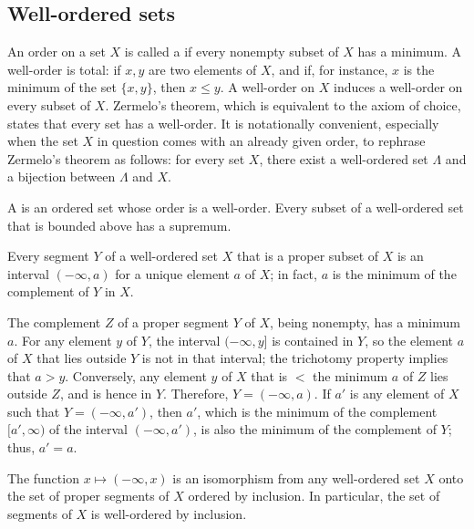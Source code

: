 \documentclass{article}
\begin{document}
\subsection{Well-ordered sets}
\label{sec:62tryw49}

An order on a set \(X\) is called a  if every
nonempty subset of \(X\) has a minimum.  A well-order is total: if
\(x,y\) are two elements of \(X\), and if, for instance, \(x\) is the
minimum of the set \(\{ x, y \}\), then \(x \leq y\).  A well-order on
\(X\) induces a well-order on every subset of \(X\).  Zermelo's
theorem, which is equivalent to the axiom of choice, states that every
set has a well-order.  It is notationally convenient, especially when
the set \(X\) in question comes with an already given order, to
rephrase Zermelo's theorem as follows: for every set \(X\), there
exist a well-ordered set \(\Lambda\) and a bijection between
\(\Lambda\) and \(X\).

A  is an ordered set whose order is a
well-order.  Every subset of a well-ordered set that is bounded above
has a supremum.

\begin{theorem}
  \label{thm:htdzbbwv}
  Every segment \(Y\) of a well-ordered set \(X\) that is a proper
  subset of \(X\) is an interval \((-\infty, a)\) for a unique element
  \(a\) of \(X\); in fact, \(a\) is the minimum of the complement of
  \(Y\) in \(X\).
\end{theorem}

The complement \(Z\) of a proper segment \(Y\) of \(X\), being
nonempty, has a minimum \(a\).  For any element \(y\) of \(Y\), the
interval \((-\infty,y]\) is contained in \(Y\), so the element \(a\)
of \(X\) that lies outside \(Y\) is not in that interval; the
trichotomy property implies that \(a > y\).  Conversely, any element
\(y\) of \(X\) that is \(<\) the minimum \(a\) of \(Z\) lies outside
\(Z\), and is hence in \(Y\).  Therefore, \(Y = (-\infty,a)\).  If
\(a'\) is any element of \(X\) such that \(Y = (-\infty, a')\), then
\(a'\), which is the minimum of the complement \([a', \infty)\) of the
interval \((-\infty, a')\), is also the minimum of the complement of
\(Y\); thus, \(a' = a\).

\begin{theorem}
  \label{thm:b4yv5x3a}
  The function \(x \mapsto (-\infty, x)\) is an isomorphism from any
  well-ordered set \(X\) onto the set of proper segments of \(X\)
  ordered by inclusion.  In particular, the set of segments of \(X\)
  is well-ordered by inclusion.
\end{theorem}
\end{document}
